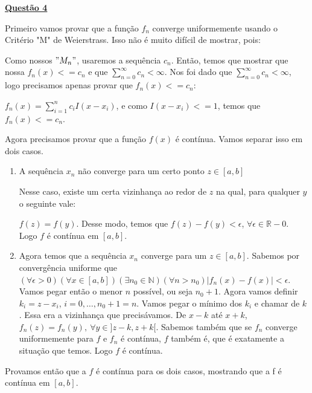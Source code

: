 \documentclass[12pt]{article}
\newcommand{\real}{\mathbb{R}}
\newcommand{\gsum}[3]{\displaystyle\sum_{#1}^#2 #3}
\newcommand{\mytitle}[1]{\textbf{\underline{#1}}}
\begin{document}
\mytitle{Questão 4}

Primeiro vamos provar que a função $f_n$ converge uniformemente usando o Critério "M" de Weierstrass. Isso não é muito difícil de mostrar, pois:

Como nossos $"M_n"$, usaremos a sequência $c_n$. Então, temos que mostrar que nossa $f_n(x) <= c_n$ e que $\gsum{n=0}{\infty}{c_n} < \infty$. Nos foi dado que $\gsum{n=0}{\infty}{c_n} < \infty$, logo precisamos apenas provar que $f_n(x) <= c_n$:

$f_n(x) = \gsum{i=1}{n}{c_iI(x-x_i)}$, e como $I(x-x_i) <= 1$, temos que $f_n(x) <= c_n$.

Agora precisamos provar que a função $f(x)$ é contínua. Vamos separar isso em dois casos.

\begin{enumerate}
  
\item A sequência $x_n$ não converge para um certo ponto $z \in [a, b]$

  Nesse caso, existe um certa vizinhança ao redor de $z$ na qual, para qualquer $y$ o seguinte vale:

  $f(z) = f(y)$. Desse modo, temos que $f(z) - f(y) < \epsilon$, $\forall \epsilon \in \real-{0}$. Logo $f$ é contínua em $[a, b]$.

  
\item Agora temos que a sequência $x_n$  converge para um $z \in [a, b]$. Sabemos por convergência uniforme que $(\forall \epsilon > 0) (\forall x \in [a, b]) (\exists n_0 \in \mathbb{N}) (\forall n > n_0) |f_n(x) - f(x)| < \epsilon$. Vamos pegar então o menor $n$ possível, ou seja $n_0+1$. Agora vamos definir $k_i = z - x_i$, $i = 0,\dots ,n_0+1 = n$. Vamos pegar o mínimo dos $k_i$ e chamar de $k$. Essa era a vizinhança que precisávamos. De $x-k$ até $x+k$, $f_n(z) = f_n(y),\: \forall y \in ]z-k, z+k[$. Sabemos também que se $f_n$  converge uniformemente para $f$ e $f_n$ é contínua, $f$ também é, que é exatamente a situação que temos. Logo $f$ é contínua.

\end{enumerate}

Provamos então que a $f$ é contínua para os dois casos, mostrando que a f é contínua em $[a, b]$.
\end{document}
